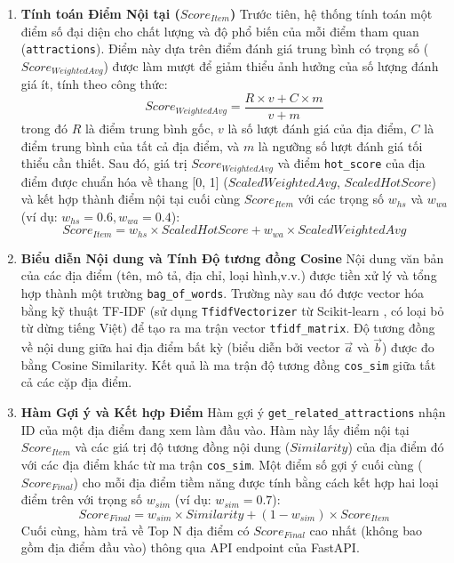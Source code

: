\begin{enumerate}
 

\item  \textbf{Tính toán Điểm Nội tại ($Score_{Item}$)}
Trước tiên, hệ thống tính toán một điểm số đại diện cho chất lượng và độ phổ biến của mỗi điểm tham quan (\texttt{attractions}). Điểm này dựa trên điểm đánh giá trung bình có trọng số ($Score_{WeightedAvg}$) được làm mượt để giảm thiểu ảnh hưởng của số lượng đánh giá ít, tính theo công thức:
$$Score_{WeightedAvg} = \frac{R \times v + C \times m}{v + m}$$
trong đó $R$ là điểm trung bình gốc, $v$ là số lượt đánh giá của địa điểm, $C$ là điểm trung bình của tất cả địa điểm, và $m$ là ngưỡng số lượt đánh giá tối thiểu cần thiết. Sau đó, giá trị $Score_{WeightedAvg}$ và điểm \texttt{hot\_score} của địa điểm được chuẩn hóa về thang [0, 1] ($ScaledWeightedAvg$, $ScaledHotScore$) và kết hợp thành điểm nội tại cuối cùng $Score_{Item}$ với các trọng số $w_{hs}$ và $w_{wa}$ (ví dụ: $w_{hs}=0.6, w_{wa}=0.4$):
$$Score_{Item} = w_{hs} \times ScaledHotScore + w_{wa} \times ScaledWeightedAvg$$

\item  \textbf{Biểu diễn Nội dung và Tính Độ tương đồng Cosine}
Nội dung văn bản của các địa điểm (tên, mô tả, địa chỉ, loại hình,v.v.) được tiền xử lý và tổng hợp thành một trường \texttt{bag\_of\_words}. Trường này sau đó được vector hóa bằng kỹ thuật TF-IDF (sử dụng \texttt{TfidfVectorizer} từ Scikit-learn \cite{sklearn_lib}, có loại bỏ từ dừng tiếng Việt) để tạo ra ma trận vector \texttt{tfidf\_matrix}. Độ tương đồng về nội dung giữa hai địa điểm bất kỳ (biểu diễn bởi vector $\vec{a}$ và $\vec{b}$) được đo bằng Cosine Similarity.
Kết quả là ma trận độ tương đồng \texttt{cos\_sim} giữa tất cả các cặp địa điểm.

    \item  \textbf{Hàm Gợi ý và Kết hợp Điểm}
Hàm gợi ý \texttt{get\_related\_attractions} nhận ID của một địa điểm đang xem làm đầu vào. Hàm này lấy điểm nội tại $Score_{Item}$ và các giá trị độ tương đồng nội dung ($Similarity$) của địa điểm đó với các địa điểm khác từ ma trận \texttt{cos\_sim}. Một điểm số gợi ý cuối cùng ($Score_{Final}$) cho mỗi địa điểm tiềm năng được tính bằng cách kết hợp hai loại điểm trên với trọng số $w_{sim}$ (ví dụ: $w_{sim}=0.7$):
$$Score_{Final} = w_{sim} \times Similarity + (1 - w_{sim}) \times Score_{Item}$$
Cuối cùng, hàm trả về Top N địa điểm có $Score_{Final}$ cao nhất (không bao gồm địa điểm đầu vào) thông qua API endpoint của FastAPI.
\end{enumerate}

